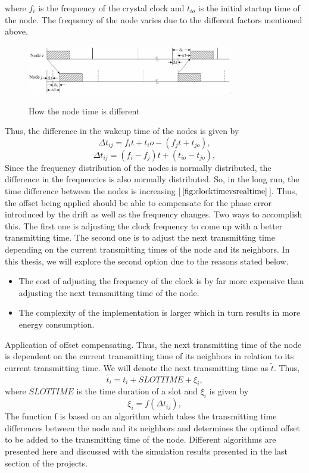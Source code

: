 \documentclass[a4paper,8pt]{report}
\begin{document}
where  $f_i$ is the frequency of the crystal clock and $t_{io}$ is
the initial startup time of the node. The frequency of the node
varies due to the different factors mentioned above.
\begin{figure}
\centering
\includegraphics[width=0.8\textwidth]{node_time}
\label{node_time}
\caption{How the node time is different}
\end{figure}
Thus, the difference in the wakeup time of the nodes is given by
\begin{equation}
\Delta t_{ij} = f_it + t_i{ o}- (f_jt + t_{jo} ),
\end{equation}
\begin{equation}
\Delta t_{ij} = (f_i - f_j)t + (t_{io}-t_{jo}),
\end{equation}
Since the frequency distribution of the nodes is normally
distributed, the difference in the frequencies is also normally
distributed. So, in the long run, the time difference between the
nodes is increasing [$\ref{fig:clocktimevsrealtime}$]. Thus, the
offset being applied should be able to compensate for the phase
error introduced by the drift as well as the frequency changes. Two
ways to accomplish this. The first one is adjusting the clock
frequency to come up with a better transmitting time. The second one
is to adjust the next transmitting time depending on the current
transmitting times of the node and its neighbors. In this thesis, we
will explore the second option due to the reasons stated below.
\begin{itemize}
\item The cost of adjusting the frequency of the clock is by far more
expensive than adjusting the next transmitting time of the node.
\item The complexity of the implementation is larger which in turn
results in more energy consumption.
\end{itemize}
Application of offset compensating. Thus, the next transmitting time
of the node is dependent on the current transmitting time of its
neighbors in relation to its current transmitting time. We will
denote the next transmitting time as $\tilde{t}$. Thus,
\begin{equation}
\tilde{t_i} = t_i + SLOTTIME + \xi_i ,
\end{equation}
where $SLOTTIME$ is the time duration of a slot and $\xi_i$ is
given by
\begin{equation}
\xi_i = f(\Delta t_{ij}) ,
\end{equation}
The function f is based on an algorithm which takes the transmitting
time differences between the node and its neighbors and determines
the optimal offset to be added to the transmitting time of the node.
\newline Different algorithms are presented here and discussed with the
simulation results presented in the last section of the projects.
\newpage
\end{document}
